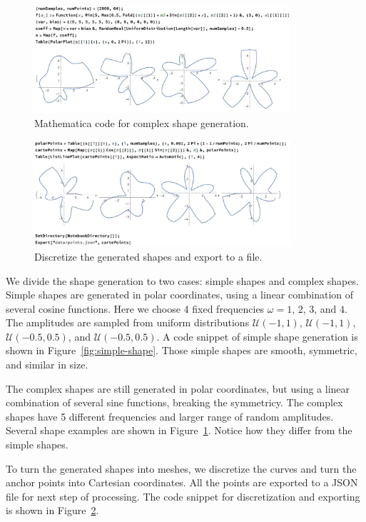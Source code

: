 \documentclass[12pt]{article}
\begin{document}
\begin{figure}[!p]
    \centering
    \includegraphics[width=0.85\textwidth]{complex-shapes.png}
    \caption{Mathematica code for complex shape generation.}
    \label{fig:complex-shape}
\end{figure}

\begin{figure}[!p]
    \centering
    \includegraphics[width=0.85\textwidth]{discretize.png}
    \caption{Discretize the generated shapes and export to a file.}
    \label{fig:discretize}
\end{figure}

We divide the shape generation to two cases: simple shapes and complex shapes.
Simple shapes are generated in polar coordinates, using a linear combination of 
several cosine functions. 
Here we choose 4 fixed frequencies $\omega=1$, $2$, $3$, and $4$.
The amplitudes are sampled from uniform distributions $\mathcal{U}(-1,1)$, 
$\mathcal{U}(-1,1)$, $\mathcal{U}(-0.5,0.5)$, and $\mathcal{U}(-0.5,0.5)$. 
A code snippet of simple shape generation is shown in 
Figure~\ref{fig:simple-shape}. 
Those simple shapes are smooth, symmetric, and similar in size.

The complex shapes are still generated in polar coordinates, but using a linear 
combination of several sine functions, breaking the symmetricy. 
The complex shapes have 5 different frequencies and larger range of random 
amplitudes. 
Several shape examples are shown in Figure~\ref{fig:complex-shape}.
Notice how they differ from the simple shapes.

To turn the generated shapes into meshes, we discretize the curves and turn the 
anchor points into Cartesian coordinates. All the points are exported to a JSON 
file for next step of processing. The code snippet for discretization and 
exporting is shown in Figure~\ref{fig:discretize}.
\end{document}
